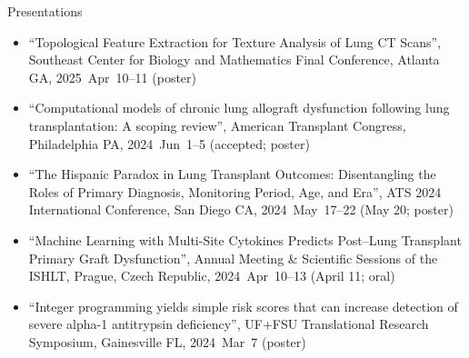 \documentclass[10pt,a4paper]{article}
\begin{document}
\vspace{.25cm}
{\sc Presentations}
\begin{itemize}[label=$\circ$,nolistsep]
\item
``Topological Feature Extraction for Texture Analysis of Lung CT Scans'', Southeast Center for Biology and Mathematics Final Conference, Atlanta GA, 2025~Apr~10--11 (poster)
\item
``Computational models of chronic lung allograft dysfunction following lung transplantation: A scoping review'', American Transplant Congress, Philadelphia PA, 2024~Jun~1--5 (accepted; poster)
\item
``The Hispanic Paradox in Lung Transplant Outcomes: Disentangling the Roles of Primary Diagnosis, Monitoring Period, Age, and Era'', ATS 2024 International Conference, San Diego CA, 2024~May~17--22 (May 20; poster)
\item
``Machine Learning with Multi-Site Cytokines Predicts Post--Lung Transplant Primary Graft Dysfunction'', Annual Meeting \& Scientific Sessions of the ISHLT, Prague, Czech Republic, 2024~Apr~10--13 (April 11; oral)
\item
``Integer programming yields simple risk scores that can increase detection of severe alpha-1 antitrypsin deficiency'', UF+FSU Translational Research Symposium, Gainesville FL, 2024~Mar~7 (poster)

\end{itemize}
\end{document}
